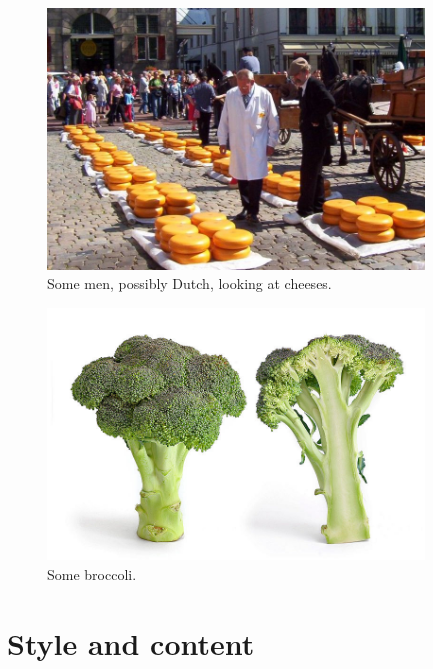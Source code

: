 \begin{figure}
\centerline{\includegraphics[width=10cm]{images/men-and-cheese.jpg}}
\caption{Some men, possibly Dutch, looking at cheeses.}\label{figure:menandcheeses}
\end{figure}

\begin{figure}
\centerline{\includegraphics[width=10cm]{images/broccoli.jpg}}
\caption{Some broccoli.}\label{figure:broccoli}
\end{figure}

\section{Style and content}

